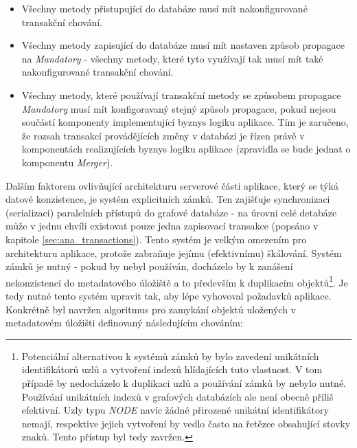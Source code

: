 \begin{itemize}
   \item Všechny metody přistupující do databáze musí mít nakonfigurované transakční chování.
   \item Všechny metody zapisující do databáze musí mít nastaven způsob propagace na \textit{Mandatory} - všechny metody,
   které tyto využívají tak musí mít také nakonfigurované transakční chování.
   \item Všechny metody, které používají transakční metody se způsobem propagace \textit{Mandatory} musí mít konfigoravaný
   stejný způsob propagace, pokud nejsou součástí komponenty implementující byznys logiku aplikace. Tím je zaručeno, že rozsah
   transakcí provádějících změny v databázi je řízen právě v komponentách realizujících byznys logiku aplikace (zpravidla se bude jednat o komponentu \textit{Merger}).
\end{itemize}


Dalším faktorem ovlivňující architekturu serverové části aplikace, který se týká datové konzistence, je systém explicitních zámků. Ten zajišťuje synchronizaci (serializaci) paralelních přístupů do grafové databáze - na úrovni celé detabáze může v jednu chvíli existovat pouze jedna zapisovací transakce (popsáno v kapitole \ref{sec:ana_transactions}). Tento systém je velkým omezením pro architekturu aplikace, protože zabraňuje jejímu (efektivnímu) škálování. Systém zámků je nutný - pokud by nebyl používán, docházelo by k zanášení nekonzistencí do metadatového úložiště a to především k duplikacím objektů\footnote{Potenciální alternativou k systémů zámků by bylo zavedení unikátních identifikátorů uzlů a vytvoření indexů hlídajících tuto vlastnost. V tom případě by nedocházelo k duplikaci uzlů a používání zámků by nebylo nutné. Používání unikátních indexů v grafových databázích ale není obecně příliš efektivní. Uzly typu \textit{NODE} navíc žádné přirozené unikátní identifikátory nemají, respektive jejich vytvoření by vedlo často na řetězce obsahující stovky znaků. Tento přístup byl tedy zavržen.}. Je tedy nutné tento systém upravit tak, aby lépe vyhovoval požadavků aplikace. Konkrétně byl navržen algoritmus pro zamykání objektů uložených v metadatovém úložišti definovaný následujícím chováním:

